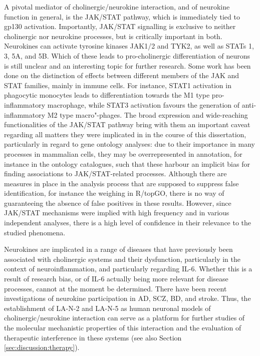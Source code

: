 A pivotal mediator of cholinergic/neurokine interaction, and of neurokine function in general, is the JAK/STAT pathway, which is immediately tied to gp130 activation. Importantly, \mbox{JAK/STAT} signalling is exclusive to neither cholinergic nor neurokine processes, but is critically important in both. Neurokines can activate tyrosine kinases JAK1/2 and TYK2, as well as STATs 1, 3, 5A, and 5B.\cite{Rawlings2004} Which of these leads to pro-cholinergic differentiation of neurons is still unclear and an interesting topic for further research.  Some work has been done on the distinction of effects between different members of the JAK and STAT families, mainly in immune cells. For instance, STAT1 activation in phagocytic monocytes leads to differentiation towards the M1 type pro-inflammatory macrophage, while STAT3 activation favours the generation of anti-inflammatory M2 type macro"-phages.\cite{Wang2014} The broad expression and wide-reaching functionalities of the JAK/STAT pathway bring with them an important caveat regarding all matters they were implicated in in the course of this dissertation, particularly in regard to gene ontology analyses: due to their importance in many processes in mammalian cells, they may be overrepresented in annotation, for instance in the ontology catalogues, such that these harbour an implicit bias for finding associations to JAK/STAT-related processes. Although there are measures in place in the analysis process that are supposed to suppress false identification, for instance the weighing in R/topGO, there is no way of guaranteeing the absence of false positives in these results. However, since JAK/STAT mechanisms were implied with high frequency and in various independent analyses, there is a high level of confidence in their relevance to the studied phenomena.    

Neurokines are implicated in a range of diseases that have previously been associated with cholinergic systems and their dysfunction, particularly in the context of neuroinflammation, and particularly regarding IL-6. Whether this is a result of research bias, or of IL-6 actually being more relevant for disease processes, cannot at the moment be determined. There have been recent investigations of neurokine participation in AD,\cite{Pasquin2015, Baazaoui2018} SCZ,\cite{Chase2016, Girgis2018} BD,\cite{Goldsmith2016,Lu2019,Wiener2019} and stroke.\cite{Kang2012, Kang2013, Bustamante2014, Armstead2019} Thus, the establishment of LA-N-2 and LA-N-5 as human neuronal models of cholinergic/neurokine interaction can serve as a platform for further studies of the molecular mechanistic properties of this interaction and the evaluation of therapeutic interference in these systems (see also Section \ref{sec:discussion:therapy}).
 
